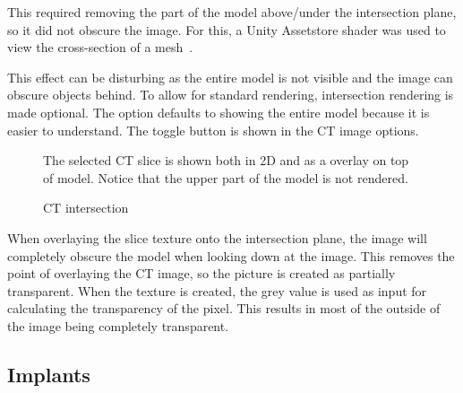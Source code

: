 \documentclass[a4paper]{report}
\begin{document}
This required removing the part of the model above/under the intersection plane, so it did not obscure the image. For this, a Unity Assetstore shader was used to view the cross-section of a mesh~\cite{aldandarawy_unity_2019}.

This effect can be disturbing as the entire model is not visible and the image can obscure objects behind. To allow for standard rendering, intersection rendering is made optional. The option defaults to showing the entire model because it is easier to understand.
The toggle button is shown in the CT image options.

\begin{figure}[h!]
    \centering
	\hfill
	\caption{CT intersection}\label{intersection}
  \small
  The selected CT slice is shown both in 2D and as a overlay on top of model. Notice that the upper part of the model is not rendered.
\end{figure}

When overlaying the slice texture onto the intersection plane, the image will completely obscure the model when looking down at the image. This removes the point of overlaying the CT image, so the picture is created as partially transparent. When the texture is created, the grey value is used as input for calculating the transparency of the pixel. This results in most of the outside of the image being completely transparent.

\subsection{Implants}
\end{document}
